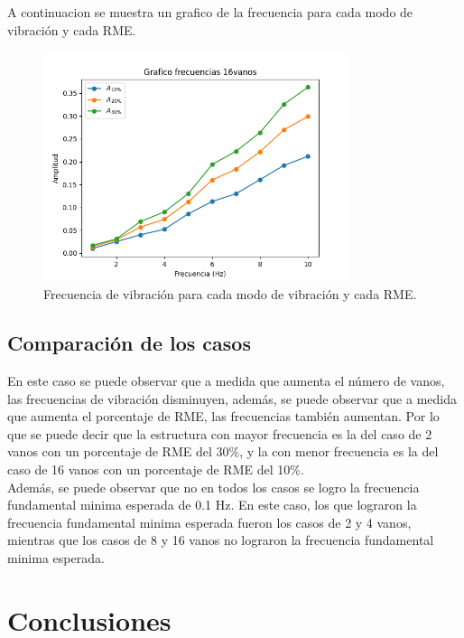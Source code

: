 A continuacion se muestra un grafico de la frecuencia para cada modo de vibración y cada RME. 

\begin{figure}[H]
    \centering
    \includegraphics[width=0.8\textwidth]{../grafico_frecuencias_16vanos.png}
    \caption{Frecuencia de vibración para cada modo de vibración y cada RME.}
\end{figure}

\subsection{Comparación de los casos}

En este caso se puede observar que a medida que aumenta el número de vanos, las frecuencias de vibración disminuyen, además, se puede observar que a medida que aumenta el porcentaje de RME, las frecuencias también aumentan. Por lo que se puede decir que la estructura con mayor frecuencia es la del caso de 2 vanos con un porcentaje de RME del 30\%, y la con menor frecuencia es la del caso de 16 vanos con un porcentaje de RME del 10\%.\\
Además, se puede observar que no en todos los casos se logro la frecuencia fundamental minima esperada de 0.1 Hz. En este caso, los que lograron la frecuencia fundamental minima esperada fueron los casos de 2 y 4 vanos, mientras que los casos de 8 y 16 vanos no lograron la frecuencia fundamental minima esperada.

\section{Conclusiones}